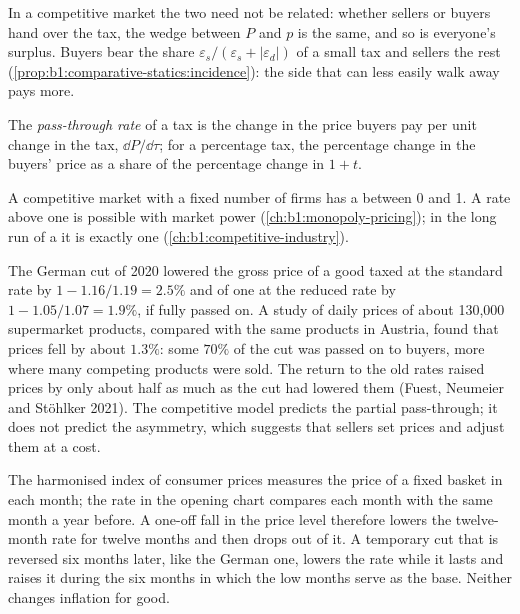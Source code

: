 In a competitive market the two need not be related: whether sellers or
buyers hand over the tax, the wedge between $P$ and $p$ is the same, and so is
everyone's surplus. Buyers bear the share $\varepsilon_s/(\varepsilon_s + |\varepsilon_d|)$ of a small
tax and sellers the rest (\cref{prop:b1:comparative-statics:incidence}):
the side that can less easily walk away pays more.

\begin{definition}\label{def:b1:partial-equilibrium-welfare:pass-through}
The \emph{pass-through rate} of a tax is the change in the price buyers pay
per unit change in the tax, $\dd P/\dd\tau$; for a percentage tax, the
percentage change in the buyers' price as a share of the percentage change
in $1 + t$.
\end{definition}

A competitive market with a fixed number of firms has a 
between 0 and 1. A rate above one is possible with market power
(\cref{ch:b1:monopoly-pricing}); in the long run of a  it is exactly one (\cref{ch:b1:competitive-industry}).

\begin{record}
The German cut of 2020 lowered the gross price of a good taxed at the
standard rate by $1 - 1.16/1.19 = 2.5\%$ and of one at the reduced rate by
$1 - 1.05/1.07 = 1.9\%$, if fully passed on. A study of daily prices of about
130,000 supermarket products, compared with the same products in Austria,
found that prices fell by about $1.3\%$: some $70\%$ of the cut was passed on
to buyers, more where many competing products were sold. The return to the
old rates raised prices by only about half as much as the cut had lowered
them (Fuest, Neumeier and Stöhlker 2021). %
The competitive model predicts the partial pass-through; it does not
predict the asymmetry, which suggests that sellers set prices and adjust
them at a cost.
\end{record}

\begin{measure}
The harmonised index of consumer prices measures the price of a fixed
basket in each month; the rate in the opening chart compares each month
with the same month a year before. A one-off fall in the price level
therefore lowers the twelve-month rate for twelve months and then drops out
of it. A temporary cut that is reversed six months later, like the German
one, lowers the rate while it lasts and raises it during the six months in
which the low months serve as the base. Neither changes inflation for good.
\end{measure}

